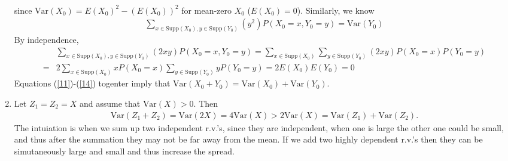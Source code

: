 \begin{exercise}
\begin{solution}
\begin{enumerate}
\begin{align}
		\end{align}
		since $\text{Var}(X_0)=E(X_0)^2-(E(X_0))^2$ for mean-zero $X_0$ ($E(X_0)=0$).
		Similarly,  we know 
		\begin{align}
			\sum_{x\in \text{Supp}(X_0),y\in \text{Supp}(Y_0)} (y^2 ) P(X_0=x,Y_0=y)=\text{Var}(Y_0) \label{13}
		\end{align}
		By independence,
		\begin{align}
			&\sum_{x\in \text{Supp}(X_0),y\in \text{Supp}(Y_0)} ( 2xy) P(X_0=x,Y_0=y) =  \sum_{x\in \text{Supp}(X_0)}\sum_{y\in \text{Supp}(Y_0)} ( 2xy) P(X_0=x)P(Y_0=y)\nonumber \\
			=& 2\sum_{x\in \text{Supp}(X_0)}  x   P(X_0=x) \sum_{y\in \text{Supp}(Y_0)}yP(Y_0=y)= 2 E(X_0)E(Y_0)=0 \label{14}
		\end{align}
		Equations (\ref{11})-(\ref{14}) togenter imply that $	\text{Var}(X_0+Y_0)=	\text{Var}(X_0)+	\text{Var}(Y_0).$
		\item 	Let $Z_1=Z_2=X$ and assume that $\text{Var}(X)>0$. Then 
		\begin{align*}
			\text{Var}(Z_1+Z_2)=	\text{Var}(2X) =4\text{Var}(X) > 2\text{Var}(X)=\text{Var}(Z_1)+\text{Var}(Z_2).
		\end{align*}
		The intuiation is when we sum up two independent r.v.'s, since they are independent, when one is large the other one could be small, and thus after the summation they may not be far away from the mean. If we add two highly dependent r.v.'s then they can be simutaneously large and small and thus increase the spread. 
	\end{enumerate}
	\end{solution}
\end{exercise}




